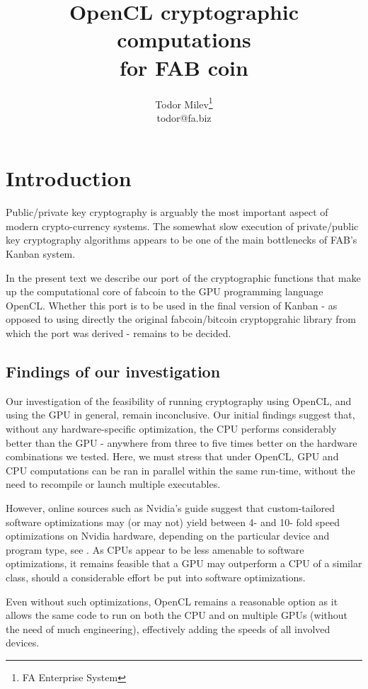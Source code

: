 \documentclass{article}
\title{
OpenCL cryptographic computations \\
for FAB coin
}
\author{Todor Milev\footnote{FA Enterprise System}\\ todor@fa.biz}
\begin{document}
\maketitle
\section{Introduction}
Public/private key cryptography is arguably the most important aspect of modern crypto-currency systems. The somewhat slow execution of private/public key cryptography algorithms appears to be one of the main bottlenecks of FAB's Kanban system. 

In the present text we describe our port of the cryptographic functions that make up the computational core of fabcoin to the GPU programming language OpenCL. Whether this port is to be used in the final version of Kanban - as opposed to using directly the original fabcoin/bitcoin cryptopgrahic library from which the port was derived - remains to be decided.

\subsection{Findings of our investigation}
Our investigation of the feasibility of running cryptography using OpenCL, and using the GPU in general, remain inconclusive. Our initial findings suggest that, without any hardware-specific optimization, the CPU performs considerably better than the GPU - anywhere from three to five times better on the hardware combinations we tested.  Here, we must stress that under OpenCL, GPU and CPU computations can be ran in parallel within the same run-time, without the need to recompile or launch multiple executables. 

However, online sources such as Nvidia's guide \cite{NVIDIA:openCLBestPractices} suggest that custom-tailored software optimizations may (or may not) yield between 4- and 10- fold speed optimizations on Nvidia hardware, depending on the particular device and program type, see \cite[page 22]{NVIDIA:openCLBestPractices}. As CPUs appear to be less amenable to software optimizations, it remains feasible that a GPU may outperform a CPU of a similar class, should a considerable effort be put into software optimizations. 

Even without such optimizations, OpenCL remains a reasonable option as it allows the same code to run on both the CPU and on multiple GPUs (without the need of much engineering), effectively adding the speeds of all involved devices. 
\end{document}
